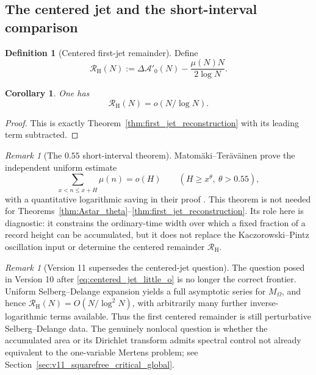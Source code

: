 \documentclass[11pt]{amsart}
\numberwithin{equation}{section}
\theoremstyle{plain}
\newtheorem{corollary}[theorem]{Corollary}
\theoremstyle{definition}
\newtheorem{definition}[theorem]{Definition}
\theoremstyle{remark}
\newtheorem{remark}[theorem]{Remark}
\begin{document}
\subsection{The centered jet and the short-interval comparison}
\label{subsec:centered_jet_short_interval}

\begin{definition}[Centered first-jet remainder]
\label{def:centered_jet}
Define
\begin{equation}
\mathcal R_{\mathrm H}(N)
:=
\Delta\mathcal A'_0(N)-\frac{\mu(N)N}{2\log N}.
\label{eq:centered_jet_definition}
\end{equation}
\end{definition}

\begin{corollary}
\label{cor:centered_jet_little_o}
One has
\begin{equation}
\boxed{\mathcal R_{\mathrm H}(N)=o(N/\log N).}
\label{eq:centered_jet_little_o}
\end{equation}
\end{corollary}

\begin{proof}
This is exactly Theorem~\ref{thm:first_jet_reconstruction} with its leading
term subtracted.
\end{proof}

\begin{remark}[The \(0.55\) short-interval theorem]
\label{rem:short_interval_055}
Matom\"aki--Ter\"av\"ainen prove the independent uniform estimate
\begin{equation}
\sum_{x<n\le x+H}\mu(n)=o(H)
\qquad
(H\ge x^\theta,\ \theta>0.55),
\label{eq:MT_055}
\end{equation}
with a quantitative logarithmic saving in their proof
\cite{MatomakiTeravainen2023}.  This theorem is not needed for
Theorems~\ref{thm:Astar_theta}--\ref{thm:first_jet_reconstruction}.  Its role
here is diagnostic: it constrains the ordinary-time width over which a fixed
fraction of a record height can be accumulated, but it does not replace the
Kaczorowski--Pintz oscillation input or determine the centered remainder
\(\mathcal R_{\mathrm H}\).
\end{remark}

\begin{remark}[Version 11 supersedes the centered-jet question]
\label{rem:centered_jet_superseded}
The question posed in Version 10 after \eqref{eq:centered_jet_little_o} is no
longer the correct frontier.  Uniform Selberg--Delange expansion yields a full
asymptotic series for \(M_\Omega\), and hence
\(\mathcal R_{\mathrm H}(N)=O(N/\log^2N)\), with arbitrarily many further
inverse-logarithmic terms available.  Thus the first centered remainder is
still perturbative Selberg--Delange data.  The genuinely nonlocal question is
whether the accumulated area or its Dirichlet transform admits spectral
control not already equivalent to the one-variable Mertens problem; see
Section~\ref{sec:v11_squarefree_critical_global}.
\end{remark}
\end{document}
